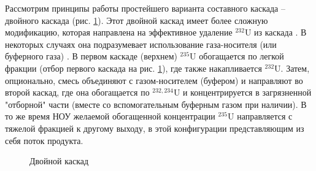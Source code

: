 Рассмотрим принципы работы простейшего варианта составного каскада -- двойного каскада (рис. \ref{fig:double_ru}). Этот двойной каскад имеет более сложную модификацию, которая направлена на эффективное удаление $^{232}$U из каскада \cite{SosninYuChelcov, TehnicheskieResheniyaPo, SposobIzotopnogoVosstanovleniya}. В некоторых случаях она подразумевает использование газа-носителя (или буферного газа) \cite{prusakovCorrectingIsotopicComposition2008, SposobIzotopnogoVosstanovleniyab}. В первом каскаде (верхнем) $^{235}$U обогащается по легкой фракции (отбор первого каскада на рис. \ref{fig:double_ru}), где также накапливается $^{232}$U. Затем, опционально, смесь объединяют с газом-носителем (буфером) и направляют во второй каскад, где она обогащается по $^{232,234}$U и концентрируется в загрязненной "отборной" части (вместе со вспомогательным буферным газом при наличии). В то же время НОУ желаемой обогащенной концентрации $^{235}$U направляется с тяжелой фракцией к другому выходу, в этой конфигурации представляющим из себя поток продукта.
\begin{figure}[ht]
  \caption{Двойной каскад}\label{fig:double_ru}
\end{figure}

